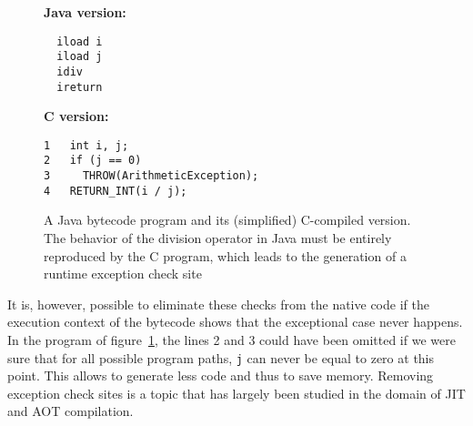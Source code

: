\begin{figure}[t]
\begin{center}
\begin{minipage}[b]{0.4\linewidth}
\textbf{Java version:}
\centering
\begin{verbatim}
  iload i
  iload j
  idiv
  ireturn
\end{verbatim}
\end{minipage}
\hspace{0.5cm}
\begin{minipage}[b]{0.5\linewidth}
\textbf{C version:}
\centering
\begin{verbatim}
1   int i, j;
2   if (j == 0) 
3     THROW(ArithmeticException);
4   RETURN_INT(i / j);
\end{verbatim}
\end{minipage}
\end{center}
\caption{A Java bytecode program and its (simplified) C-compiled version. The behavior of the division operator in Java must be entirely reproduced by the C program, which leads to the generation of a runtime exception check site}
\label{fig:javatoc}
\end{figure}

It is, however, possible to eliminate these checks from the native code if the execution context of the bytecode shows that the exceptional case never happens. In the program of figure~\ref{fig:javatoc}, the lines 2 and 3 could have been omitted if we were sure that for all possible program paths, \texttt{j} can never be equal to zero at this point. This allows to generate less code and thus to save memory. Removing exception check sites is a topic that has largely been studied in the domain of JIT and AOT compilation.
